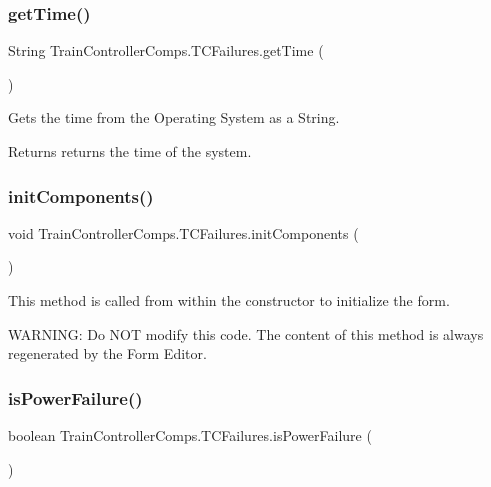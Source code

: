 \subsubsection{\texorpdfstring{get\+Time()}{getTime()}}
{\footnotesize\ttfamily String Train\+Controller\+Comps.\+T\+C\+Failures.\+get\+Time (\begin{DoxyParamCaption}{ }\end{DoxyParamCaption})\hspace{0.3cm}{\ttfamily [private]}}



Gets the time from the Operating System as a String. 

\begin{DoxyReturn}{Returns}
returns the time of the system. 
\end{DoxyReturn}
\mbox{\label{classTrainControllerComps_1_1TCFailures_abb8526b0ea750ed8d0570ae2e42713f8}} 
\subsubsection{\texorpdfstring{init\+Components()}{initComponents()}}
{\footnotesize\ttfamily void Train\+Controller\+Comps.\+T\+C\+Failures.\+init\+Components (\begin{DoxyParamCaption}{ }\end{DoxyParamCaption})\hspace{0.3cm}{\ttfamily [private]}}



This method is called from within the constructor to initialize the form. 

W\+A\+R\+N\+I\+NG\+: Do N\+OT modify this code. The content of this method is always regenerated by the Form Editor. \mbox{\label{classTrainControllerComps_1_1TCFailures_ab4d70425a3e693a1e21462deb74c8d6b}} 
\subsubsection{\texorpdfstring{is\+Power\+Failure()}{isPowerFailure()}}
{\footnotesize\ttfamily boolean Train\+Controller\+Comps.\+T\+C\+Failures.\+is\+Power\+Failure (\begin{DoxyParamCaption}{ }\end{DoxyParamCaption})\hspace{0.3cm}{\ttfamily [private]}}



